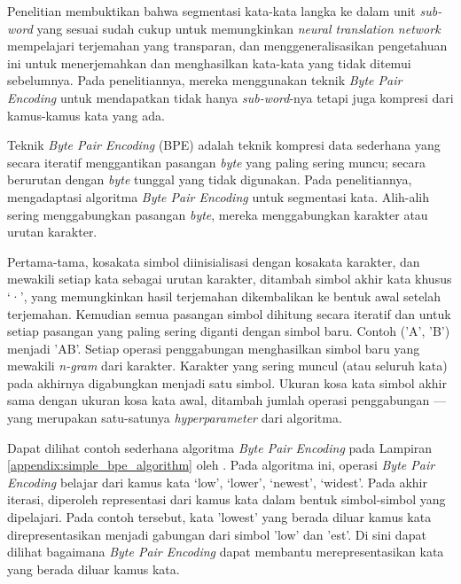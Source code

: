     Penelitian \parencite{Sennrich_Haddow_Birch_2016} membuktikan bahwa segmentasi kata-kata langka ke dalam unit \textit{sub-word} yang sesuai sudah cukup untuk memungkinkan \textit{neural translation network} mempelajari terjemahan yang transparan, dan menggeneralisasikan pengetahuan ini untuk menerjemahkan dan menghasilkan kata-kata yang tidak ditemui sebelumnya. Pada penelitiannya, mereka menggunakan teknik \textit{Byte Pair Encoding} untuk mendapatkan tidak hanya \textit{sub-word}-nya tetapi juga kompresi dari kamus-kamus kata yang ada.

    Teknik \textit{Byte Pair Encoding} (BPE) \parencite{GageBPE1994} adalah teknik kompresi data sederhana yang secara iteratif menggantikan pasangan \textit{byte} yang paling sering muncu; secara berurutan dengan \textit{byte} tunggal yang tidak digunakan. Pada penelitiannya, \parencite{Sennrich_Haddow_Birch_2016} mengadaptasi algoritma \textit{Byte Pair Encoding} untuk segmentasi kata. Alih-alih sering menggabungkan pasangan \textit{byte}, mereka menggabungkan karakter atau urutan karakter.

    Pertama-tama, kosakata simbol diinisialisasi dengan kosakata karakter, dan mewakili setiap kata sebagai urutan karakter, ditambah simbol akhir kata khusus ‘·’, yang memungkinkan hasil terjemahan dikembalikan ke bentuk awal setelah terjemahan. Kemudian semua pasangan simbol dihitung secara iteratif dan untuk setiap pasangan yang paling sering diganti dengan simbol baru. Contoh ('A', 'B') menjadi 'AB'. Setiap operasi penggabungan menghasilkan simbol baru yang mewakili \textit{n-gram} dari karakter. Karakter yang sering muncul (atau seluruh kata) pada akhirnya digabungkan menjadi satu simbol. Ukuran kosa kata simbol akhir sama dengan ukuran kosa kata awal, ditambah jumlah operasi penggabungan --- yang merupakan satu-satunya \textit{hyperparameter} dari algoritma.

    Dapat dilihat contoh sederhana algoritma \textit{Byte Pair Encoding} pada Lampiran \ref{appendix:simple_bpe_algorithm} oleh \parencite{Sennrich_Haddow_Birch_2016}. Pada algoritma ini, operasi \textit{Byte Pair Encoding} belajar dari kamus kata {‘low’, ‘lower’, ‘newest’, ‘widest’}. Pada akhir iterasi, diperoleh representasi dari kamus kata dalam bentuk simbol-simbol yang dipelajari. Pada contoh tersebut, kata 'lowest' yang berada diluar kamus kata direpresentasikan menjadi gabungan dari simbol 'low' dan 'est'. Di sini dapat dilihat bagaimana \textit{Byte Pair Encoding} dapat membantu merepresentasikan kata yang berada diluar kamus kata. 

